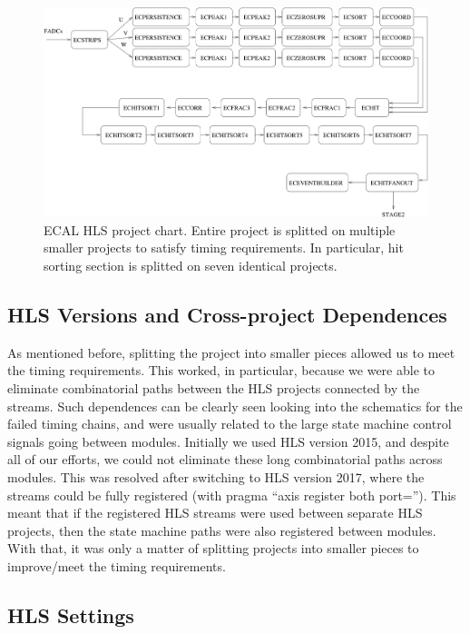 \begin{figure}[hbt]
	\centering
	\includegraphics[width=1.0\columnwidth,keepaspectratio]{img/hls_chart.png}
	\caption{ECAL HLS project chart. Entire project is splitted on multiple smaller projects to satisfy timing requirements. In particular, hit sorting section is splitted on seven identical projects.}
	\label{fig:hls_chart}
\end{figure}


\subsection{HLS Versions and Cross-project Dependences}

As mentioned before, splitting the project into smaller pieces allowed us to meet the timing requirements. This worked, in particular, because we were able to eliminate combinatorial paths between the HLS projects connected by the streams. Such dependences can be clearly seen looking into the schematics for the failed timing chains, and were usually related to the large state machine control signals going between modules. Initially we used HLS version 2015, and despite all of our efforts, we could not eliminate these long combinatorial paths across modules. This was resolved after switching to HLS version 2017, where the streams could be fully registered (with pragma ``axis register both port=''). This meant that if the registered HLS streams were used between separate HLS projects, then the state machine paths were also registered between modules. With that, it was only a matter of splitting projects into smaller pieces to improve/meet the timing requirements.


\subsection{HLS Settings}

